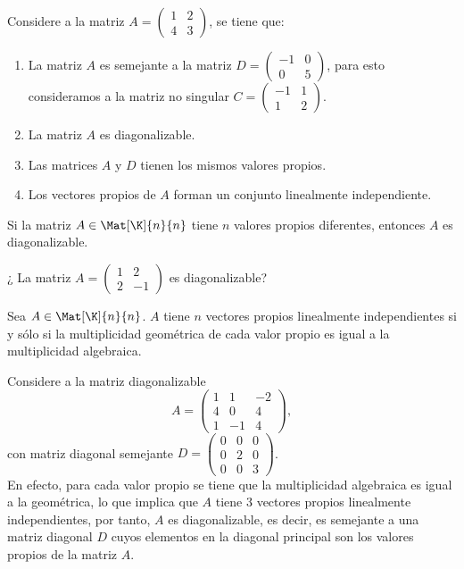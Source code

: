 \documentclass[compacto,10pt]{pubciencias-notas}
\begin{document}
\begin{ejem}\hspace{0pt} 
Considere a la matriz $A=\begin{pmatrix}1&2\\4&3\end{pmatrix}$, se tiene que:
\begin{enumerate}
\item La matriz $A$ es semejante a la matriz $D = \begin{pmatrix}-1&0\\0&5\end{pmatrix}$, para esto consideramos a la matriz no singular $C = \begin{pmatrix}-1&1\\1&2\end{pmatrix}$.
\item La matriz $A$ es diagonalizable.
\item Las matrices $A$ y $D$ tienen los mismos valores propios.
\item Los vectores propios de $A$ forman un conjunto linealmente independiente.
\end{enumerate}
\end{ejem}

\begin{teo}
Si la matriz $A \in \Mat[\K]{n}{n}$ tiene $n$ valores propios diferentes, entonces $A$ es diagonalizable.
\end{teo}

\begin{ejer}\label{Ejer1}
¿ La matriz
$
A=\begin{pmatrix}
1&2\\
2&-1
\end{pmatrix}
$
es diagonalizable?
\end{ejer}
\begin{teo}
Sea $A\in\Mat[\K]{n}{n}$. $A$ tiene $n$ vectores propios linealmente independientes si y sólo si la multiplicidad geométrica de cada valor propio es igual a la multiplicidad algebraica.
\end{teo}

\begin{ejem}\label{Cap7:ejem04} 
Considere a la matriz diagonalizable
\[
A=\begin{pmatrix}1&1&-2\\4&0&4\\1&-1&4\end{pmatrix},
\]
con matriz diagonal semejante $D = \begin{pmatrix}0&0&0\\0&2&0\\0&0&3\end{pmatrix}$. \\
En efecto, para cada valor propio se tiene que la multiplicidad algebraica es igual a la geométrica, lo que implica que $A$ tiene $3$ vectores propios linealmente independientes, por tanto, $A$ es diagonalizable, es decir, es semejante a una matriz diagonal $D$ cuyos elementos en la diagonal principal son los valores propios de la matriz $A$.
\end{ejem}
\end{document}
